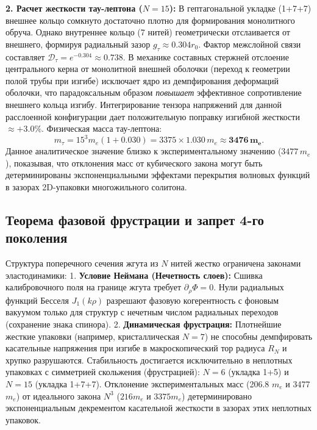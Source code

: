 \documentclass[11pt,a4paper]{article}
\begin{document}
	\textbf{2. Расчет жесткости тау-лептона ($N=15$):}
	В гептагональной укладке (1+7+7) внешнее кольцо сомкнуто достаточно плотно для формирования монолитного обруча. Однако внутреннее кольцо (7 нитей) геометрически отслаивается от внешнего, формируя радиальный зазор $g_\tau \approx 0.304 r_0$. Фактор межслойной связи составляет $\mathcal{D}_\tau = e^{-0.304} \approx 0.738$.
	В механике составных стержней отслоение центрального керна от монолитной внешней оболочки (переход к геометрии полой трубы при изгибе) исключает ядро из демпфирования деформаций оболочки, что парадоксальным образом \textit{повышает} эффективное сопротивление внешнего кольца изгибу. Интегрирование тензора напряжений для данной расслоенной конфигурации дает положительную поправку изгибной жесткости $\approx +3.0\%$. Физическая масса тау-лептона:
	\begin{equation}
		m_\tau = 15^3 m_e (1 + 0.030) = 3375 \times 1.030 \, m_e \approx \mathbf{3476 \, m_e}.
	\end{equation}
	Данное аналитическое значение близко к экспериментальному значению ($3477 \, m_e$), показывая, что отклонения масс от кубического закона могут быть детерминированы экспоненциальными эффектами перекрытия волновых функций в зазорах 2D-упаковки многожильного солитона.
	
	\subsection{Теорема фазовой фрустрации и запрет 4-го поколения}
	Структура поперечного сечения жгута из $N$ нитей жестко ограничена законами эластодинамики:
	1. \textbf{Условие Неймана (Нечетность слоев):} Сшивка калибровочного поля на границе жгута требует $\partial_\rho \Phi = 0$. Нули радиальных функций Бесселя $J_1(k\rho)$ разрешают фазовую когерентность с фоновым вакуумом только для структур с нечетным числом радиальных переходов (сохранение знака спинора).
	2. \textbf{Динамическая фрустрация:} Плотнейшие жесткие упаковки (например, кристаллическая $N=7$) не способны демпфировать касательные напряжения при изгибе в макроскопический тор радиуса $R_N$ и хрупко разрушаются. Стабильность достигается исключительно в неплотных упаковках с симметрией скольжения (фрустрацией): $N=6$ (укладка 1+5) и $N=15$ (укладка 1+7+7).
	Отклонение экспериментальных масс (206.8 $m_e$ и 3477 $m_e$) от идеального закона $N^3$ ($216 m_e$ и $3375 m_e$) детерминировано экспоненциальным декрементом касательной жесткости в зазорах этих неплотных упаковок.
	
\end{document}
